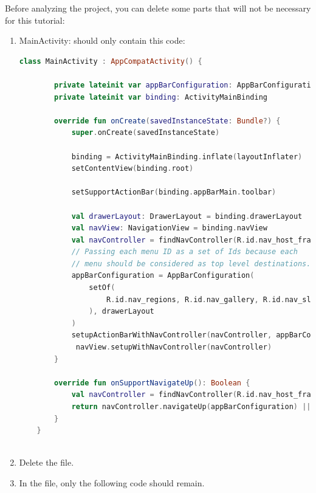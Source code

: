 \documentclass[a4paper, 12pt]{article}
\begin{document}
Before analyzing the project, you can delete some parts that will not be necessary for this tutorial:

\begin{enumerate}
    \item MainActivity: should only contain this code:

    \begin{lstlisting}[caption={Activity Main code.}, label={code:activity_main}, language=Kotlin]
        class MainActivity : AppCompatActivity() {

        private lateinit var appBarConfiguration: AppBarConfiguration
        private lateinit var binding: ActivityMainBinding
    
        override fun onCreate(savedInstanceState: Bundle?) {
            super.onCreate(savedInstanceState)
    
            binding = ActivityMainBinding.inflate(layoutInflater)
            setContentView(binding.root)
    
            setSupportActionBar(binding.appBarMain.toolbar)
    
            val drawerLayout: DrawerLayout = binding.drawerLayout
            val navView: NavigationView = binding.navView
            val navController = findNavController(R.id.nav_host_fragment_content_main)
            // Passing each menu ID as a set of Ids because each
            // menu should be considered as top level destinations.
            appBarConfiguration = AppBarConfiguration(
                setOf(
                    R.id.nav_regions, R.id.nav_gallery, R.id.nav_slideshow, R.id.nav_home
                ), drawerLayout
            )
            setupActionBarWithNavController(navController, appBarConfiguration)
             navView.setupWithNavController(navController)
        }
    
        override fun onSupportNavigateUp(): Boolean {
            val navController = findNavController(R.id.nav_host_fragment_content_main)
            return navController.navigateUp(appBarConfiguration) || super.onSupportNavigateUp()
        }
    }
    
\end{lstlisting}

    \item  Delete the \texttt{} file.
    
    \item In the \texttt{} file, only the following code should remain.
    
\end{enumerate}
\end{document}
